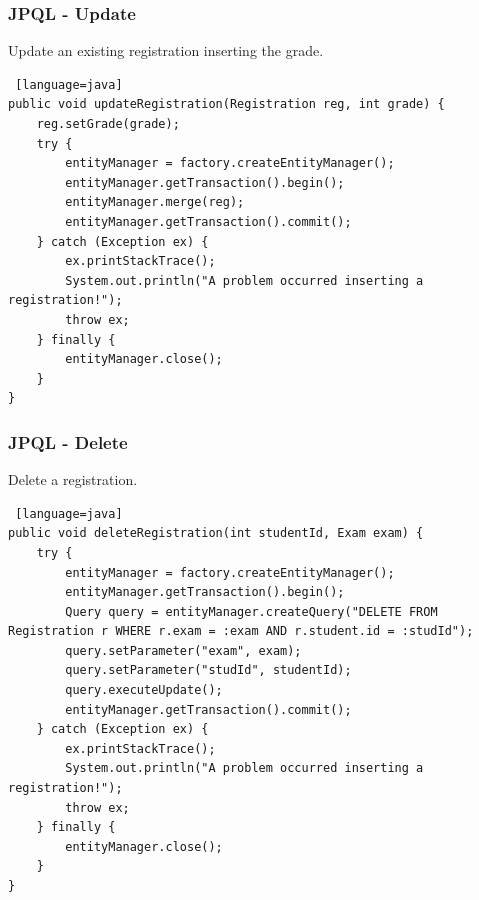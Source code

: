 \documentclass{beamer}
\begin{document}
\begin{frame} [fragile]
\frametitle{JPQL - Update}
Update an existing registration inserting the grade.
\begin{lstlisting} [language=java]
public void updateRegistration(Registration reg, int grade) {
	reg.setGrade(grade);
	try {
		entityManager = factory.createEntityManager();
		entityManager.getTransaction().begin();
		entityManager.merge(reg);
		entityManager.getTransaction().commit();
	} catch (Exception ex) {
		ex.printStackTrace();
		System.out.println("A problem occurred inserting a registration!");
		throw ex;
	} finally {
		entityManager.close();
	}
}
\end{lstlisting}
\end{frame}

\begin{frame} [fragile]
\frametitle{JPQL - Delete}
Delete a registration.
\begin{lstlisting} [language=java]
public void deleteRegistration(int studentId, Exam exam) {
	try {
		entityManager = factory.createEntityManager();
		entityManager.getTransaction().begin();
		Query query = entityManager.createQuery("DELETE FROM Registration r WHERE r.exam = :exam AND r.student.id = :studId");
		query.setParameter("exam", exam);
		query.setParameter("studId", studentId);
		query.executeUpdate();
		entityManager.getTransaction().commit();
	} catch (Exception ex) {
		ex.printStackTrace();
		System.out.println("A problem occurred inserting a registration!");
		throw ex;
	} finally {
		entityManager.close();
	}
}

\end{lstlisting}
\end{frame}
\end{document}
